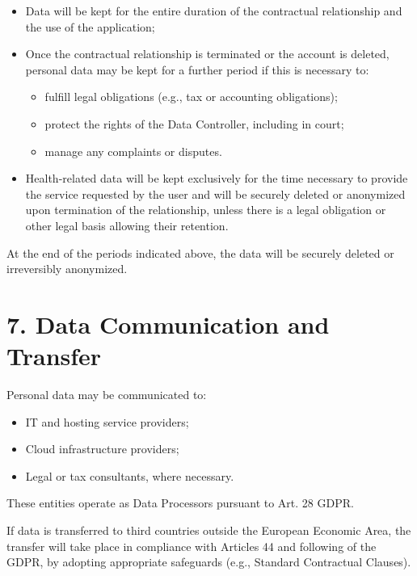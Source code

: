 \documentclass[a4paper,12pt]{article}
\begin{document}
    \begin{itemize}
        \item Data will be kept for the entire duration of the contractual relationship and the use of the application;

        \item Once the contractual relationship is terminated or the account is deleted, personal data may be kept for a further period if this is necessary to:
        \begin{itemize}
            \item fulfill legal obligations (e.g., tax or accounting obligations);
            \item protect the rights of the Data Controller, including in court;
            \item manage any complaints or disputes.
        \end{itemize}

        \item Health-related data will be kept exclusively for the time necessary to provide the service requested by the user and will be securely deleted or anonymized upon termination of the relationship, unless there is a legal obligation or other legal basis allowing their retention.
    \end{itemize}

    At the end of the periods indicated above, the data will be securely deleted or irreversibly anonymized.

    \section*{7. Data Communication and Transfer}

    Personal data may be communicated to:

    \begin{itemize}
        \item IT and hosting service providers;
        \item Cloud infrastructure providers;
        \item Legal or tax consultants, where necessary.
    \end{itemize}

    These entities operate as Data Processors pursuant to Art. 28 GDPR.

    If data is transferred to third countries outside the European Economic Area, the transfer will take place in compliance with Articles 44 and following of the GDPR, by adopting appropriate safeguards (e.g., Standard Contractual Clauses).
\end{document}
